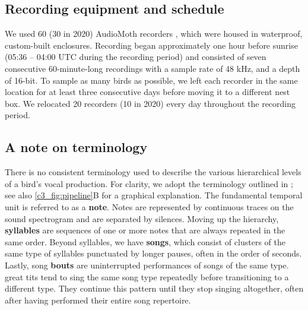 \subsection{Recording equipment and schedule}

We used 60 (30 in 2020) AudioMoth recorders \parencite{hill2019}, which were housed in waterproof, custom-built enclosures. Recording began approximately one hour before sunrise (05:36 – 04:00 UTC during the recording period) and consisted of seven consecutive 60-minute-long recordings with a sample rate of 48 kHz, and a depth of 16-bit. To sample as many birds as possible, we left each recorder in the same location for at least three consecutive days before moving it to a different nest box. We relocated 20 recorders (10 in 2020) every day throughout the recording period.

\begin{tcolorbox}[colback=tablegrey, boxrule=0pt, colframe=white, sharp corners] %
    \subsection{A note on terminology}
    There is no consistent terminology used to describe the various hierarchical levels of a bird's vocal production. For clarity, we adopt the terminology outlined in \cite{thompson1994}; see also \autoref{c3_fig:pipeline}B for a graphical explanation. 
    \medskip
    The fundamental temporal unit is referred to as a \textbf{note}. Notes are represented by continuous traces on the sound spectrogram and are separated by silences. Moving up the hierarchy, \textbf{syllables} are sequences of one or more notes that are always repeated in the same order. Beyond syllables, we have \textbf{songs}, which consist of clusters of the same type of syllables punctuated by longer pauses, often in the order of seconds. Lastly, song \textbf{bouts} are uninterrupted performances of songs of the same type. great tits tend to sing the same song type repeatedly before transitioning to a different type. They continue this pattern until they stop singing altogether, often after having performed their entire song repertoire.
\end{tcolorbox}

